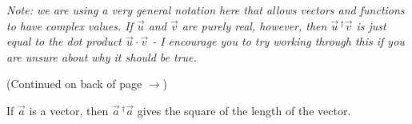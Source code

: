 \begin{questions}
\begin{center}
\begin{tabular}{|C{2in}| C{2in} | C{2in}|}
				
			\end{tabular}
			\end{center}
		
		\emph{Note: we are using a very general notation here that allows vectors and functions to have complex values. If $\vec u$ and $\vec{v}$ are purely real, however, then $\vec u \,^\dag \vec v$ is just equal to the dot product $\vec u \cdot \vec v$ - I encourage you to try working through this if you are unsure about why it should be true.}
		
		\begin{flushright}(Continued on back of page $\rightarrow$)	\end{flushright}
		
		\newpage
		\question If $\vec a$ is a vector, then $\vec a\,^\dag \vec a$ gives the square of the length of the vector.
\end{questions}
